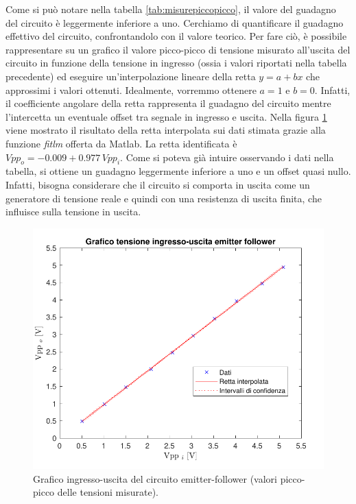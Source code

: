 \noindent
Come si può notare nella tabella \ref{tab:misurepiccopicco}, il valore del guadagno del circuito è leggermente inferiore a uno. Cerchiamo di quantificare il guadagno effettivo del circuito, confrontandolo con il valore teorico. Per fare ciò, è possibile rappresentare su un grafico il valore picco-picco di tensione misurato all'uscita del circuito in funzione della tensione in ingresso (ossia i valori riportati nella tabella precedente) ed eseguire un'interpolazione lineare della retta $y=a+bx$ che approssimi i valori ottenuti. Idealmente, vorremmo ottenere $a=1$ e $b=0$. Infatti, il coefficiente angolare della retta rappresenta il guadagno del circuito mentre l'intercetta un eventuale offset tra segnale in ingresso e uscita. Nella figura \ref{fig:emitterfollwer_inout} viene mostrato il risultato della retta interpolata sui dati stimata grazie alla funzione \textit{fitlm} offerta da Matlab. La retta identificata è $Vpp_o=-0.009+0.977\,Vpp_i$. Come si poteva già intuire osservando i dati nella tabella, si ottiene un guadagno leggermente inferiore a uno e un offset quasi nullo. Infatti, bisogna considerare che il circuito si comporta in uscita come un generatore di tensione reale e quindi con una resistenza di uscita finita, che influisce sulla tensione in uscita.
\begin{figure}[h!]
	\centering
	\includegraphics[width=0.7\linewidth]{./OtherFiles/Laboratorio 2/emitter follower-ingresso_uscita}
	\caption{Grafico ingresso-uscita del circuito emitter-follower (valori picco-picco delle tensioni misurate).}
	\label{fig:emitterfollwer_inout}
\end{figure}

